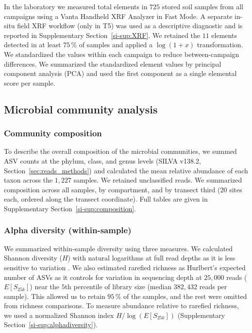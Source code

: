 \documentclass[fleqn,10pt,numbers]{olplainarticle}
\begin{document}
In the laboratory we measured total elements in $725$ stored soil samples from all campaigns using a Vanta Handheld XRF Analyzer in Fast Mode. A separate in-situ field XRF workflow (only in T5) was used as a descriptive diagnostic and is reported in Supplementary Section~\ref{si-sup:XRF}. We retained the $11$ elements
detected in at least $75\,\%$ of samples and applied a $\log(1+x)$ transformation. We standardized the values within each campaign to reduce between-campaign differences. We summarized the standardized element values by principal component analysis (PCA) and used the first component as a single elemental score per sample.


\subsection*{Microbial community analysis}
\subsubsection*{Community composition}\label{sec:composition_methods}
To describe the overall composition of the microbial communities, we summed ASV counts at the phylum, class, and genus levels (SILVA v138.2, Section~\ref{sec:reads_methods}) and calculated the mean relative abundance of each taxon across the $1{,}227$ samples. We retained unclassified reads. We summarized composition across all samples, by compartment, and by transect third ($20$ sites each, ordered along the transect coordinate). Full tables are given in Supplementary Section~\ref{si-sup:composition}.

\subsubsection*{Alpha diversity (within-sample)}\label{sec:alpha_methods}
We summarized within-sample diversity using three measures. We calculated Shannon diversity ($H$) with natural logarithms at full read depths as it is less sensitive to variation \cite{shirazi2021revisiting}. We also estimated rarefied richness as Hurlbert's expected number of ASVs as it controls for variation in sequencing depth \cite{hurlbert1971nonconcept} at $25{,}000$ reads ($E[S_{25k}]$) near the $5$th percentile of library size (median $382{,}432$ reads per sample). This allowed us to retain $95\,\%$ of the samples, and the rest were omitted from richness comparisons. To measure abundance relative to rarefied richness, we used a normalized Shannon index $H/\log(E[S_{25k}])$ (Supplementary Section~\ref{si-sup:alphadiversity}).
\end{document}
